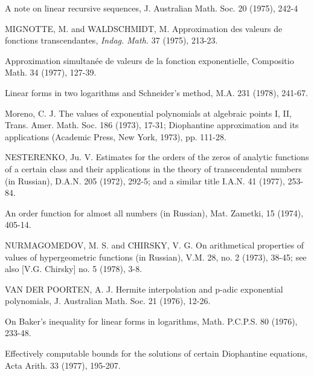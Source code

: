 \begin{hanglist}
    \item \hspace{1.5em} A note on linear recursive sequences, J. Australian Math. Soc. 20 (1975), 242-4
    \item MIGNOTTE, M. and WALDSCHMIDT, M. Approximation des valeurs de fonctions transcendantes, \textit{Indag. Math.} 37 (1975), 213-23.
    \item \hspace{1.5em} Approximation simultanée de valeurs de la fonction exponentielle, Compositio Math. 34 (1977), 127-39.
    \item \hspace{1.5em} Linear forms in two logarithms and Schneider's method, M.A. 231 (1978), 241-67.
    \item Moreno, C. J. The values of exponential polynomials at algebraic points I, II, Trans. Amer. Math. Soc. 186 (1973), 17-31; Diophantine approximation and its applications (Academic Press, New York, 1973), pp. 111-28.
    \item NESTERENKO, Ju. V. Estimates for the orders of the zeros of analytic functions of a certain class and their applications in the theory of transcendental numbers (in Russian), D.A.N. 205 (1972), 292-5; and a similar title I.A.N. 41 (1977), 253-84.
    \item \hspace{1.5em} An order function for almost all numbers (in Russian), Mat. Zametki, 15 (1974), 405-14.
    \item NURMAGOMEDOV, M. S. and CHIRSKY, V. G. On arithmetical properties of values of hypergeometric functions (in Russian), V.M. 28, no. 2 (1973), 38-45; see also [V.G. Chirsky] no. 5 (1978), 3-8.
    \item VAN DER POORTEN, A. J. Hermite interpolation and p-adic exponential polynomials, J. Australian Math. Soc. 21 (1976), 12-26.
    \item \hspace{1.5em} On Baker's inequality for linear forms in logarithms, Math. P.C.P.S. 80 (1976), 233-48.
    \item \hspace{1.5em} Effectively computable bounds for the solutions of certain Diophantine equations, Acta Arith. 33 (1977), 195-207.

\end{hanglist}
